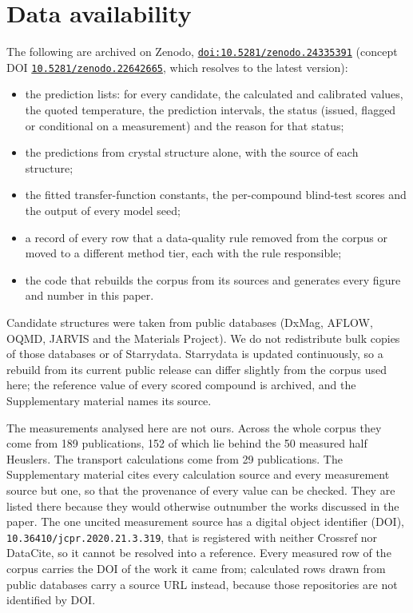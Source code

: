 \documentclass[preprint,12pt]{elsarticle}
\newcommand{\repourl}{\href{https://doi.org/10.5281/zenodo.24335391}%
  {\texttt{doi:10.5281/zenodo.24335391}} (concept DOI
  \href{https://doi.org/10.5281/zenodo.22642665}{\texttt{10.5281/zenodo.22642665}}, which resolves
  to the latest version)}
\begin{document}
\section*{Data availability}
\label{sec:data-availability}

{\raggedright The following are archived on Zenodo, \repourl:\par}
\begin{itemize}[itemsep=1pt, topsep=3pt, leftmargin=1.5em]
  \item the prediction lists: for every candidate, the calculated and calibrated values, the quoted
        temperature, the prediction intervals, the status (issued, flagged or conditional on a
        measurement) and the reason for that status;
  \item the predictions from crystal structure alone, with the source of each structure;
  \item the fitted transfer-function constants, the per-compound blind-test scores and the output
        of every model seed;
  \item a record of every row that a data-quality rule removed from the corpus or moved to a
        different method tier, each with the rule responsible;
  \item the code that rebuilds the corpus from its sources and generates every figure and number in
        this paper.
\end{itemize}
Candidate structures were taken from public databases (DxMag, AFLOW, OQMD, JARVIS and the Materials
Project). We do not redistribute bulk copies of those databases or of Starrydata. Starrydata is
updated continuously, so a rebuild from its current public release can differ slightly from the
corpus used here; the reference value of every scored compound is archived, and the Supplementary
material names its source.

The measurements analysed here are not ours. Across the whole corpus they come from \num{189}
publications, \num{152} of which lie behind the \num{50} measured half Heuslers. The transport
calculations come from \num{29} publications. The Supplementary material cites every calculation
source and every measurement source but one, so that the provenance of every value can be checked.
They are listed there because they would otherwise outnumber the works discussed in the paper. The
one uncited
measurement source has a digital object identifier (DOI), \texttt{10.36410/jcpr.2020.21.3.319},
that is registered with neither Crossref nor DataCite, so it cannot be resolved into a reference.
Every measured row of the corpus carries the DOI of the work it came from; calculated rows drawn
from public databases carry a source URL instead, because those repositories are not identified by
DOI.
\end{document}
